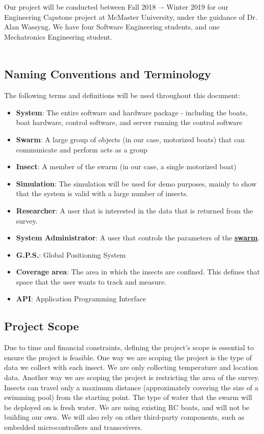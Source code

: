 \documentclass[11pt]{article}
\begin{document}
Our project will be conducted between Fall 2018 –- Winter 2019 for our Engineering Capstone project at McMaster University, under the guidance of Dr. Alan Wassyng. We have four Software Engineering students, and one Mechatronics Engineering student. \\ \\

\subsection{Naming Conventions and Terminology}
\label{sec:definitions}
The following terms and definitions will be used throughout this document:
\begin{itemize}
\item \textbf{System}: The entire software and hardware package - including the boats,
boat hardware, control software, and server running the control software
\item \textbf{Swarm}: A large group of objects (in our case, motorized boats) that can communicate and perform acts as a group
\item \textbf{Insect}: A member of the swarm (in our case, a single motorized boat)
\item \textbf{Simulation}: The simulation will be used for demo purposes, mainly to show that
the system is valid with a large number of insects.
\item \textbf{Researcher}: A user that is interested in the data that is returned from the survey.
\item \textbf{System Administrator}: A user that controls the parameters of the \hyperref[sec:definitions]{\textbf{swarm}}.
\item \textbf{G.P.S.}: Global Positioning System
\item \textbf{Coverage area}: The area in which the insects are confined. This defines that space that the user wants to track and measure.
\item \textbf{API}: Application Programming Interface
\end{itemize}

\subsection{Project Scope}
Due to time and financial constraints, defining the project's scope is essential to ensure the project is feasible. One way we are scoping the project is the type of data we collect with each insect. We are only collecting temperature and location data. Another way we are scoping the project is restricting the area of the survey. Insects can travel only a maximum distance (approximately covering the size of a swimming pool) from the starting point. The type of water that the swarm will be deployed on is fresh water. We are using existing RC boats, and will not be building our own. We will also rely on other third-party components, such as embedded microcontrollers and transceivers. \\
\end{document}

